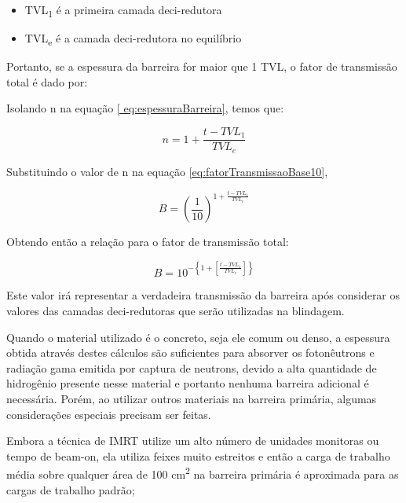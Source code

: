 \documentclass[11pt,a4paper]{article}
\begin{document}
            \begin{itemize}
                \item TVL\textsubscript{1} é a primeira camada deci-redutora
                \item TVL\textsubscript{e} é a camada deci-redutora no equilíbrio
            \end{itemize}

            Portanto, se a espessura da barreira for maior que 1 TVL, o fator de transmissão total é dado por:

            Isolando n na equação \ref{ eq:espessuraBarreira}, temos que:

            $$n = 1 + \frac{t - TVL_1}{TVL_e}$$

            Substituindo o valor de n na equação \ref{eq:fatorTransmissaoBase10},

            $$B = \left(\frac{1}{10}\right)^{1 + \frac{t - TVL_1}{TVL_e}}$$

            Obtendo então a relação para o fator de transmissão total:

            \begin{equation}
                B = 10^{-\left\{1 + \left[\frac{t - TVL_1}{TVL_e}\right]\right\}}
            \end{equation}

            Este valor irá representar a verdadeira transmissão da barreira após considerar os valores das camadas deci-redutoras que serão utilizadas na blindagem.

            
            Quando o material utilizado é o concreto, seja ele comum ou denso, a espessura obtida através destes cálculos são suficientes para absorver os fotonêutrons e radiação gama emitida por captura de neutrons, devido a alta quantidade de hidrogênio presente nesse material e portanto nenhuma barreira adicional é necessária. Porém, ao utilizar outros materiais na barreira primária, algumas considerações especiais precisam ser feitas.

            Embora a técnica de IMRT utilize um alto número de unidades monitoras ou tempo de beam-on, ela utiliza feixes muito estreitos e então a carga de trabalho média sobre qualquer área de 100 cm\textsuperscript{2} na barreira primária é aproximada para as cargas de trabalho padrão;
\end{document}
